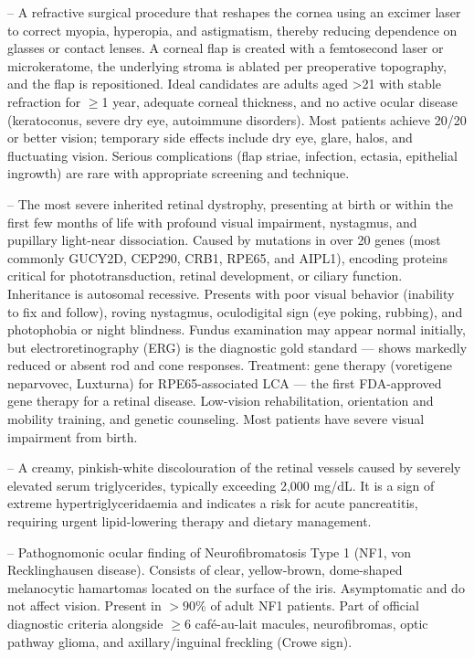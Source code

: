 -- A refractive surgical procedure that reshapes the cornea using an excimer laser to correct myopia, hyperopia, and astigmatism, thereby reducing dependence on glasses or contact lenses. A corneal flap is created with a femtosecond laser or microkeratome, the underlying stroma is ablated per preoperative topography, and the flap is repositioned. Ideal candidates are adults aged >21 with stable refraction for $\ge$1 year, adequate corneal thickness, and no active ocular disease (keratoconus, severe dry eye, autoimmune disorders). Most patients achieve 20/20 or better vision; temporary side effects include dry eye, glare, halos, and fluctuating vision. Serious complications (flap striae, infection, ectasia, epithelial ingrowth) are rare with appropriate screening and technique.

-- The most severe inherited retinal dystrophy, presenting at birth or within the first few months of life with profound visual impairment, nystagmus, and pupillary light-near dissociation. Caused by mutations in over 20 genes (most commonly GUCY2D, CEP290, CRB1, RPE65, and AIPL1), encoding proteins critical for phototransduction, retinal development, or ciliary function. Inheritance is autosomal recessive. Presents with poor visual behavior (inability to fix and follow), roving nystagmus, oculodigital sign (eye poking, rubbing), and photophobia or night blindness. Fundus examination may appear normal initially, but electroretinography (ERG) is the diagnostic gold standard — shows markedly reduced or absent rod and cone responses. Treatment: gene therapy (voretigene neparvovec, Luxturna) for RPE65-associated LCA — the first FDA-approved gene therapy for a retinal disease. Low-vision rehabilitation, orientation and mobility training, and genetic counseling. Most patients have severe visual impairment from birth.

-- A creamy, pinkish-white discolouration of the retinal vessels caused by severely elevated serum triglycerides, typically exceeding 2,000 mg/dL. It is a sign of extreme hypertriglyceridaemia and indicates a risk for acute pancreatitis, requiring urgent lipid-lowering therapy and dietary management.

-- Pathognomonic ocular finding of Neurofibromatosis Type 1 (NF1, von Recklinghausen disease). Consists of clear, yellow-brown, dome-shaped melanocytic hamartomas located on the surface of the iris. Asymptomatic and do not affect vision. Present in $>90\%$ of adult NF1 patients. Part of official diagnostic criteria alongside \(\ge\)6 café-au-lait macules, neurofibromas, optic pathway glioma, and axillary/inguinal freckling (Crowe sign).

